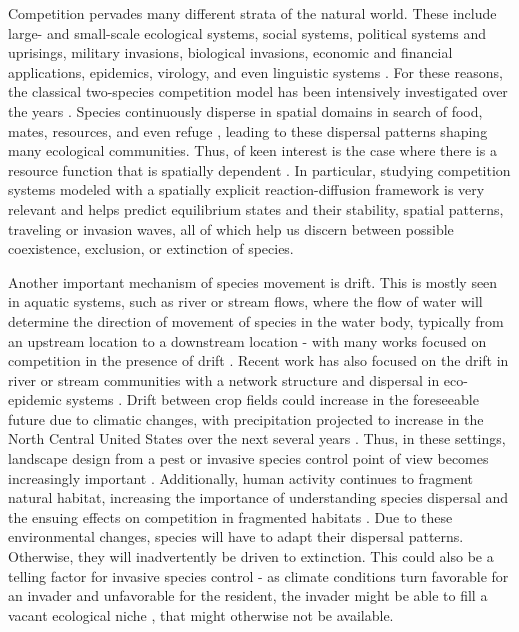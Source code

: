 \documentclass[10pt]{amsart}
\theoremstyle{plain}
\theoremstyle{definition}
\begin{document}
Competition pervades many different strata of the natural world. These include large- and small-scale ecological systems, social systems, political systems and uprisings, military invasions, biological invasions, economic and financial applications, epidemics, virology, and even linguistic systems \cite{porter2008competition, vickers1995concepts, burt2003social}. For these reasons, the classical two-species competition model has been intensively investigated over the years \cite{Cantrell2003, Chen2020, DeAngelis2016, He2013b, He2016a, He2016b, Hutson2003, Lou2006a, Lou2006b, Li2019, Lam2012, Nagahara2018, Nagahara2020}. Species continuously disperse in spatial domains in search of food, mates, resources, and even refuge \cite{zhou2016qualitative}, leading to these dispersal patterns shaping many ecological communities. Thus, of keen interest is the case where there is a resource function that is spatially dependent \cite{He2019, He2013a}. In particular, studying competition systems 
modeled with a spatially explicit reaction-diffusion framework is very relevant and helps predict equilibrium states and their stability, spatial patterns, traveling or invasion waves, all of which help us discern between possible coexistence, exclusion, or extinction of species.  

 Another important mechanism of species movement is drift. This is mostly seen in aquatic systems, such as river or stream flows, where the flow of water will determine the direction of movement of species in the water body, typically from an upstream location to a downstream location - with many works focused on competition in the presence of drift \cite{zhou2016qualitative, cantrell2007advection, zhou2016lotka}. Recent work has also focused on the drift in river or stream communities with a network structure and dispersal in eco-epidemic systems \cite{chen2023evolution, chen2024evolution, salako2024degenerate}. Drift between crop fields could increase in the foreseeable future due to climatic changes, with precipitation projected to increase in the North Central United States over the next several years \cite{lee2023ipcc}. Thus, in these settings, landscape design from a pest or invasive species control point of view becomes increasingly important \cite{haan2020predicting}. Additionally, human activity continues to fragment natural habitat, increasing the importance of understanding species dispersal and the ensuing effects on competition in fragmented habitats \cite{rohwader2022foraging, fletcher2018habitat}.
Due to these environmental changes, species will have to adapt their dispersal patterns. Otherwise, they will inadvertently be driven to extinction. This could also be a telling factor for invasive species control - as climate conditions turn favorable for an invader and unfavorable for the resident, the invader might be able to fill a vacant ecological niche \cite{lekevivcius2009vacant}, that might otherwise not be available. 
\end{document}
